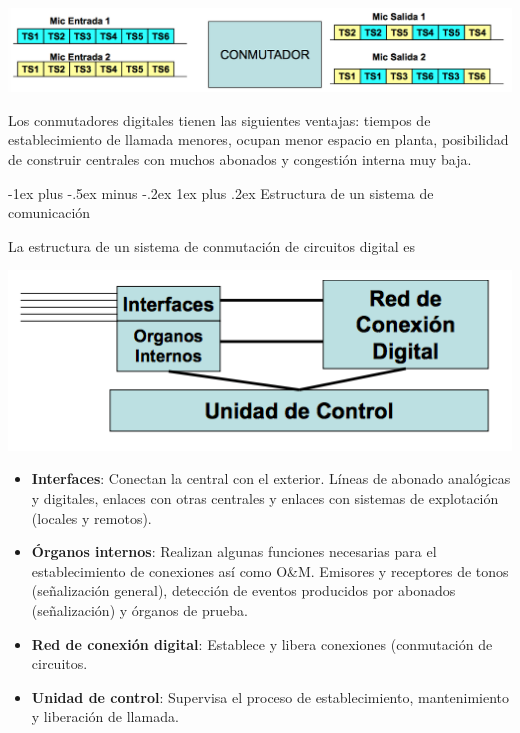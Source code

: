 \documentclass[10pt,portrait, twocolumn]{article}
\makeatletter
\renewcommand{\subsubsection}{\@startsection{subsubsection}{3}{0mm}%
                                {-1ex plus -.5ex minus -.2ex}%
                                {1ex plus .2ex}%
                                {\normalfont\small\bfseries}}
\makeatother
\begin{document}
	\begin{center}
		\includegraphics[scale = 0.3]{aaa}
	\end{center}

Los conmutadores digitales tienen las siguientes ventajas: tiempos de establecimiento de llamada menores, ocupan menor espacio en planta, posibilidad de construir centrales con muchos abonados y congestión interna muy baja.
	
\subsubsection{Estructura de un sistema de comunicación}
	
La estructura de un sistema de conmutación de circuitos digital es	
	
	\begin{center}
		\includegraphics[scale = 0.3]{estr}
	\end{center}
	
	\begin{itemize}
		\item \textbf{Interfaces}: Conectan la central con el exterior. Líneas de abonado analógicas y digitales, enlaces con otras centrales y enlaces con sistemas de explotación (locales y remotos).
		\item \textbf{Órganos internos}: Realizan algunas funciones necesarias para el establecimiento de conexiones así como O\&M. Emisores y receptores de tonos (señalización general), detección de eventos producidos por abonados (señalización) y órganos de prueba.
		\item \textbf{Red de conexión digital}: Establece y libera conexiones (conmutación de circuitos.
		\item \textbf{Unidad de control}: Supervisa el proceso de establecimiento, mantenimiento y liberación de llamada.
	\end{itemize}
	
\end{document}
